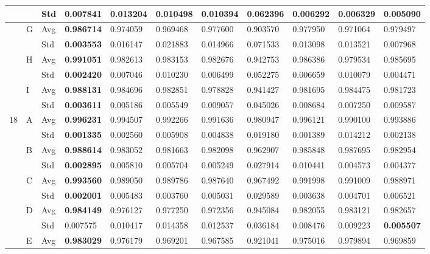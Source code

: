 \documentclass{article} %
\begin{document}
\begin{tabular}{|p{0.5in}|p{0.3in}|p{0.3in}|p{0.5in}|p{0.6in}|p{0.5in}|p{0.5in}|p{0.5in}|p{0.5in}|p{0.5in}|p{0.5in}|}
 &  & Std & 0.007841  & 0.013204  & 0.010498  & 0.010394  & 0.062396  & 0.006292  & 0.006329  & \textbf{0.005090 } \\ \hline 
 & G & Avg & \textbf{0.986714 } & 0.974059  & 0.969468  & 0.977600  & 0.903570  & 0.977950  & 0.971064  & 0.979497  \\ \hline 
 &  & Std & \textbf{0.003553 } & 0.016147  & 0.021883  & 0.014966  & 0.071533  & 0.013098  & 0.013521  & 0.007968  \\ \hline 
 & H & Avg & \textbf{0.991051 } & 0.982613  & 0.983153  & 0.982676  & 0.942753  & 0.986386  & 0.979534  & 0.985695  \\ \hline 
 &  & Std & \textbf{0.002420 } & 0.007046  & 0.010230  & 0.006499  & 0.052275  & 0.006659  & 0.010079  & 0.004471  \\ \hline 
 & I & Avg & \textbf{0.988131 } & 0.984696  & 0.982851  & 0.978828  & 0.941427  & 0.981695  & 0.984475  & 0.981723  \\ \hline 
 &  & Std & \textbf{0.003611 } & 0.005186  & 0.005549  & 0.009057  & 0.045026  & 0.008684  & 0.007250  & 0.009587  \\ \hline 
18 & A & Avg & \textbf{0.996231 } & 0.994507  & 0.992266  & 0.991636  & 0.980947  & 0.996121  & 0.990100  & 0.993886  \\ \hline 
 &  & Std & \textbf{0.001335 } & 0.002560  & 0.005908  & 0.004838  & 0.019180  & 0.001389  & 0.014212  & 0.002138  \\ \hline 
 & B & Avg & \textbf{0.988614 } & 0.983052  & 0.981663  & 0.982098  & 0.962907  & 0.985848  & 0.987695  & 0.982954  \\ \hline 
 &  & Std & \textbf{0.002895 } & 0.005810  & 0.005704  & 0.005249  & 0.027914  & 0.010441  & 0.004573  & 0.004377  \\ \hline 
 & C & Avg & \textbf{0.993560 } & 0.989050  & 0.989786  & 0.987640  & 0.967492  & 0.991998  & 0.991009  & 0.988971  \\ \hline 
 &  & Std & \textbf{0.002001 } & 0.005483  & 0.003760  & 0.005031  & 0.029589  & 0.003638  & 0.004701  & 0.006521  \\ \hline 
 & D & Avg & \textbf{0.984149 } & 0.976127  & 0.977250  & 0.972356  & 0.945084  & 0.982055  & 0.983121  & 0.982657  \\ \hline 
 &  & Std & 0.007575  & 0.010417  & 0.014358  & 0.012537  & 0.036184  & 0.008476  & 0.009223  & \textbf{0.005507 } \\ \hline 
 & E & Avg & \textbf{0.983029 } & 0.976179  & 0.969201  & 0.967585  & 0.921041  & 0.975016  & 0.979894  & 0.969859  \\ \hline 

\end{tabular}
\end{document}
